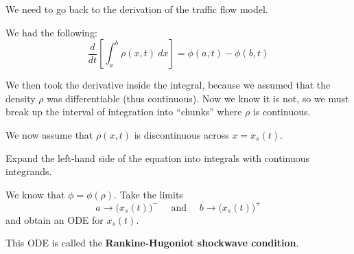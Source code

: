 \begin{slide}
\question
We need to go back to the derivation of the traffic flow model.

We had the following:
\[
\frac{d}{dt} \left[ \int_a^b \rho(x,t) ~dx \right] = \phi(a,t) - \phi(b,t)
\]

We then took the derivative inside the integral, because we assumed that the density $\rho$ was differentiable (thus continuous). Now we know it is not, so we must break up the interval of integration into ``chunks'' where $\rho$ is continuous.

We now assume that $\rho(x,t)$ is discontinuous across $x=x_s(t)$.

\begin{parts}
	\item Expand the left-hand side of the equation into integrals with continuous integrands.
	\item We know that $\phi = \phi(\rho)$. Take the limits
	\[ a \to \big(x_s(t)\big)^- \quad \text{ and } \quad b \to \big(x_s(t)\big)^+ \]
	and obtain an ODE for $x_s(t)$.
	
	This ODE is called the \textbf{Rankine-Hugoniot shockwave condition}.
	
\end{parts}
	
\end{slide}


